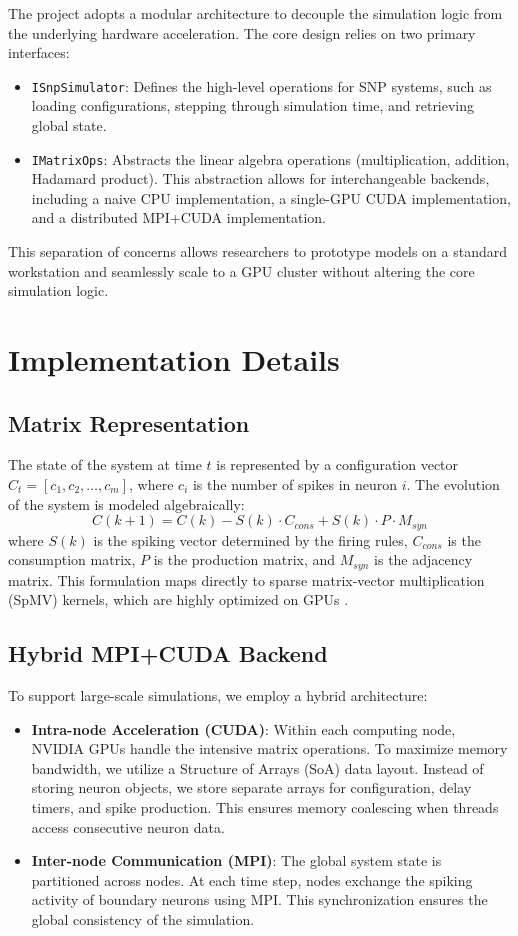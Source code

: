\documentclass[11pt, a4paper]{article}
\begin{document}
The project adopts a modular architecture to decouple the simulation logic from the underlying hardware acceleration. The core design relies on two primary interfaces:
\begin{itemize}
    \item \texttt{ISnpSimulator}: Defines the high-level operations for SNP systems, such as loading configurations, stepping through simulation time, and retrieving global state.
    \item \texttt{IMatrixOps}: Abstracts the linear algebra operations (multiplication, addition, Hadamard product). This abstraction allows for interchangeable backends, including a naive CPU implementation, a single-GPU CUDA implementation, and a distributed MPI+CUDA implementation.
\end{itemize}
This separation of concerns allows researchers to prototype models on a standard workstation and seamlessly scale to a GPU cluster without altering the core simulation logic.

\section{Implementation Details}

\subsection{Matrix Representation}
The state of the system at time $t$ is represented by a configuration vector $C_t = [c_1, c_2, \dots, c_m]$, where $c_i$ is the number of spikes in neuron $i$. The evolution of the system is modeled algebraically:
\begin{equation}
    C(k+1) = C(k) - S(k) \cdot C_{cons} + S(k) \cdot P \cdot M_{syn}
\end{equation}
where $S(k)$ is the spiking vector determined by the firing rules, $C_{cons}$ is the consumption matrix, $P$ is the production matrix, and $M_{syn}$ is the adjacency matrix. This formulation maps directly to sparse matrix-vector multiplication (SpMV) kernels, which are highly optimized on GPUs \cite{zeng2010, martinez2021}.

\subsection{Hybrid MPI+CUDA Backend}
To support large-scale simulations, we employ a hybrid architecture:
\begin{itemize}
    \item \textbf{Intra-node Acceleration (CUDA)}: Within each computing node, NVIDIA GPUs handle the intensive matrix operations. To maximize memory bandwidth, we utilize a Structure of Arrays (SoA) data layout. Instead of storing neuron objects, we store separate arrays for configuration, delay timers, and spike production. This ensures memory coalescing when threads access consecutive neuron data.
    \item \textbf{Inter-node Communication (MPI)}: The global system state is partitioned across nodes. At each time step, nodes exchange the spiking activity of boundary neurons using MPI. This synchronization ensures the global consistency of the simulation.
\end{itemize}
\end{document}
